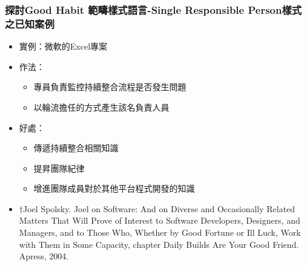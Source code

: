 \documentclass[utf8x]{beamer}
\begin{document}
\begin{frame}[c]%
\frametitle{探討Good Habit 範疇樣式語言-\hspace{3pt}Single Responsible Person樣式之已知案例}
\begin{itemize}
\setlength{\itemindent}{1em}
\item[] 實例：微軟的Excel專案\dag
\item[] 作法：
\begin{itemize}
\item 專員負責監控持續整合流程是否發生問題
\item 以輪流擔任的方式產生該名負責人員
\end{itemize}
\item[] 好處：
\begin{itemize}
\item 傳遞持續整合相關知識
\item 提昇團隊紀律
\item 增進團隊成員對於其他平台程式開發的知識
\end{itemize}
\fontsize{8pt}{8pt}\selectfont
\item[] $\dag$Joel Spolsky. Joel on Software: And on Diverse and Occasionally Related Matters That Will Prove of Interest to Software Developers, Designers, and Managers, and to Those Who, Whether by Good Fortune or Ill Luck, Work with Them in Some Capacity, chapter Daily Builds Are Your Good Friend. Apress, 2004.
\end{itemize}
\end{frame}





\end{document}
